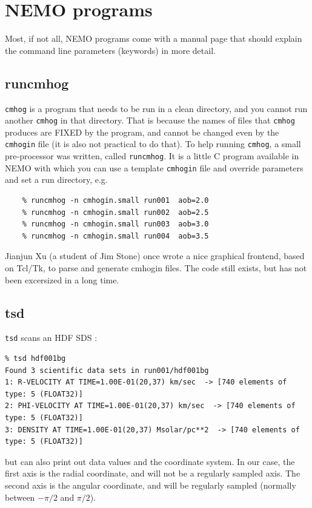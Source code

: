 \documentclass[10pt,dvips]{article}
\begin{document}
\section{NEMO programs}

Most, if not all, NEMO programs come with a manual page that should
explain the command line parameters (keywords) in more detail.

\subsection{runcmhog}

{\tt cmhog} is a program that needs to be run in a clean directory, and you
cannot run another {\tt cmhog} in that directory. That is because the names
of files that {\tt cmhog} produces are FIXED by the program, and cannot be
changed even by the {\tt cmhogin} file (it is also not practical to do that).
To help running {\tt cmhog}, a small pre-processor was written, called
{\tt runcmhog}. It is a little C program available in NEMO with which you
can use a template {\tt cmhogin} file and override parameters and set
a run directory, e.g.

\begin{verbatim}
    % runcmhog -n cmhogin.small run001  aob=2.0
    % runcmhog -n cmhogin.small run002  aob=2.5
    % runcmhog -n cmhogin.small run003  aob=3.0
    % runcmhog -n cmhogin.small run004  aob=3.5
\end{verbatim}

Jianjun Xu (a student of Jim Stone) once wrote a nice graphical frontend,
based on Tcl/Tk, to parse and generate cmhogin files. The code still
exists, but has not been excersized in a long time.

\subsection{tsd}

{\tt tsd} scans an HDF SDS :
\footnotesize\begin{verbatim}
% tsd hdf001bg 
Found 3 scientific data sets in run001/hdf001bg
1: R-VELOCITY AT TIME=1.00E-01(20,37) km/sec  -> [740 elements of type: 5 (FLOAT32)]
2: PHI-VELOCITY AT TIME=1.00E-01(20,37) km/sec  -> [740 elements of type: 5 (FLOAT32)]
3: DENSITY AT TIME=1.00E-01(20,37) Msolar/pc**2  -> [740 elements of type: 5 (FLOAT32)]
\end{verbatim}\normalsize

but can also print out data values and the coordinate system. In our case, the
first axis is the radial coordinate, and will not be a regularly sampled axis. The
second axis is the angular coordinate, and will be regularly sampled
(normally between $-\pi/2$ and $\pi/2$).
\end{document}
